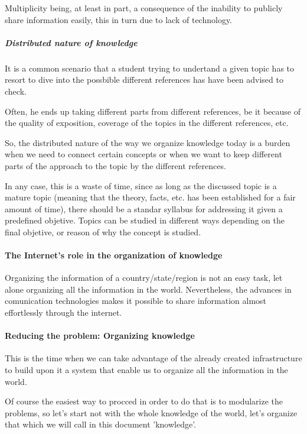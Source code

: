  
 Multiplicity being, at least in part, a consequence of the 
 inability to publicly share information easily, this in 
 turn due to lack of technology.
 
 \subparagraph{Distributed nature of knowledge}
 It is a common scenario that a student trying to undertand
 a given topic has to resort to dive into the possbible 
different references has have been advised to check. 

Often, he ends up taking different parts from different
references, be it because of the quality of exposition, 
coverage of the topics in the different references, etc.

So, the distributed nature of the way we organize knowledge
today is a burden when we need to connect certain concepts
or when we want to keep different parts of the approach to 
the topic by the different references.

In any case, this is a waste of time, since as long as the
discussed topic is a mature topic (meaning that the theory, 
facts, etc. has been established for a fair amount of time), 
there should be a standar syllabus for addressing it given 
a predefined objetive. Topics can be studied in different 
ways depending on the final objetive, or reason of why the
concept is studied.


 
 \paragraph{The Internet's role in the organization of knowledge}
 Organizing  the information of a country/state/region 
is not an easy task, let alone organizing all the information
in the world. Nevertheless, the advances in comunication 
technologies makes it possible to share information almost
effortlessly through the internet.

\paragraph{Reducing the problem: Organizing knowledge}
This is the time when we can take advantage of the already 
created infrastructure to build upon it a system that 
enable us to organize all the information in the world.

Of course the easiest way to procced in order to do that is
to modularize the problems, so let's start not with the whole
knowledge of the world, let's organize that which we will call
in this document 'knowledge'.

